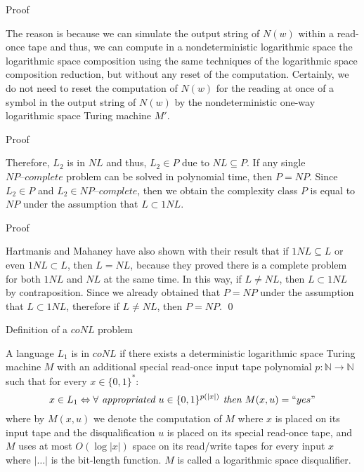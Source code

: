 \documentclass[11pt]{beamer}
\begin{document}
\begin{frame}{Proof}

The reason is because we can simulate the output string of $N(w)$ within a read-once tape and thus, we can compute in a nondeterministic logarithmic space the logarithmic space composition using the same techniques of the logarithmic space composition reduction, but without any reset of the computation. Certainly, we do not need to reset the computation of $N(w)$ for the reading at once of a symbol in the output string of $N(w)$ by the nondeterministic one-way logarithmic space Turing machine $M'$.

\end{frame}


\begin{frame}{Proof}

Therefore, $L_{2}$ is in $NL$ and thus, $L_{2} \in P$ due to $NL \subseteq P$. If any single $\textit{NP--complete}$ problem can be solved in polynomial time, then $P = NP$. Since $L_{2} \in P$ and $L_{2} \in \textit{NP--complete}$, then we obtain the complexity class $P$ is equal to $NP$ under the assumption that $L \subset 1NL$.

\end{frame}

\begin{frame}{Proof}

Hartmanis and Mahaney have also shown with their result that if $1NL \subseteq L$ or even $1NL \subset L$, then $L=NL$, because they proved there is a complete problem for both $1NL$ and $NL$ at the same time. In this way, if $L \neq NL$, then $L \subset 1NL$ by contraposition. Since we already obtained that $P = NP$ under the assumption that $L \subset 1NL$, therefore if $L \neq NL$, then $P = NP$. \qed

\end{frame}

\begin{frame}{Definition of a $coNL$ problem}

\begin{definition}
A language $L_{1}$ is in $coNL$ if there exists a deterministic logarithmic space Turing machine $M$ with an additional special read-once input tape polynomial $p: \mathbb{N} \rightarrow \mathbb{N}$ such that for every $x \in \{0, 1\}^{*}$:
\[x \in L_{1} \Leftrightarrow \forall \textit{ appropriated } u \in \{0, 1\}^{p(|x|)} \textit{ then } M(x, u) = ``yes" \]
where by $M(x, u)$ we denote the computation of $M$ where $x$ is placed on its input tape and the disqualification $u$ is placed on its special read-once tape, and $M$ uses at most $O(\log |x|)$ space on its read/write tapes for every input $x$ where $|\ldots|$ is the bit-length function. $M$ is called a logarithmic space disqualifier.
\end{definition}

\end{frame}
\end{document}
